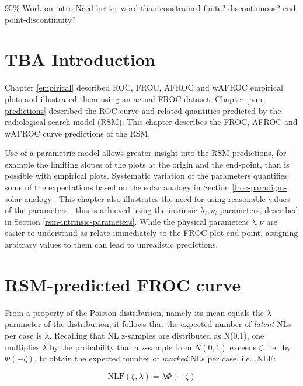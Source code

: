 \documentclass[
]{book}
\begin{document}
95\%
Work on intro
Need better word than constrained
finite? discontinuous? end-point-discontinuity?

\hypertarget{rsm-other-predictions-intro}{%
\section{TBA Introduction}\label{rsm-other-predictions-intro}}

Chapter \ref{empirical} described ROC, FROC, AFROC and wAFROC empirical plots and illustrated them using an actual FROC dataset. Chapter \ref{rsm-predictions} described the ROC curve and related quantities predicted by the radiological search model (RSM). This chapter describes the FROC, AFROC and wAFROC curve predictions of the RSM.

Use of a parametric model allows greater insight into the RSM predictions, for example the limiting slopes of the plots at the origin and the end-point, than is possible with empirical plots. Systematic variation of the parameters quantifies some of the expectations based on the solar analogy in Section \ref{froc-paradigm-solar-analogy}. This chapter also illustrates the need for using reasonable values of the parameters - this is achieved using the intrinsic \(\lambda_i, \nu_i\) parameters, described in Section \ref{rsm-intrinsic-parameters}. While the physical parameters \(\lambda, \nu\) are easier to understand as relate immediately to the FROC plot end-point, assigning arbitrary values to them can lead to unrealistic predictions.

\hypertarget{rsm-other-predictions-froc-curve}{%
\section{RSM-predicted FROC curve}\label{rsm-other-predictions-froc-curve}}

From a property of the Poisson distribution, namely its mean equals the \(\lambda\) parameter of the distribution, it follows that the expected number of \emph{latent} NLs per case is \(\lambda\). Recalling that NL z-samples are distributed as N(0,1), one multiplies \(\lambda\) by the probability that a z-sample from \(N(0,1)\) exceeds \(\zeta\), i.e.~by \(\Phi(-\zeta)\), to obtain the expected number of \emph{marked} NLs per case, i.e., NLF:

\begin{equation}
\text{NLF} \left ( \zeta, \lambda \right ) = \lambda \Phi \left (-\zeta \right )
\label{eq:rsm-other-predictions-nlf}
\end{equation}
\end{document}
